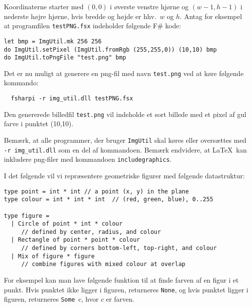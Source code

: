 \documentclass[a4paper,12pt]{article}
\begin{document}
Koordinaterne starter med $(0,0)$ i øverste venstre hjørne og
$(w-1,h-1)$ i nederste højre hjørne, hvis bredde og højde er hhv.\ $w$
og $h$.  Antag for eksempel at programfilen \texttt{testPNG.fsx}
indeholder følgende F\# kode:

\begin{lstlisting}[numbers=none,frame=none,mathescape]
let bmp = ImgUtil.mk 256 256
do ImgUtil.setPixel (ImgUtil.fromRgb (255,255,0)) (10,10) bmp
do ImgUtil.toPngFile "test.png" bmp
\end{lstlisting}

\noindent
Det er nu muligt at generere en png-fil med navn \texttt{test.png} ved
at køre følgende kommando:

\vspace{-4mm}
\begin{verbatim}
  fsharpi -r img_util.dll testPNG.fsx
\end{verbatim}
\vspace{-4mm}

\noindent
Den genererede billedfil \texttt{test.png} vil indeholde
et sort billede med et pixel af gul farve i punktet (10,10).

\noindent
Bemærk, at alle programmer, der bruger \texttt{ImgUtil} skal køres
eller oversættes med \texttt{-r img\_util.dll} som en del af
kommandoen.
%
Bemærk endvidere, at \LaTeX\ kan inkludere png-filer med
kommandoen \texttt{includegraphics}.

\vspace{2ex}

\noindent
I det følgende vil vi repræsentere geometriske figurer med følgende
datastruktur:

\begin{lstlisting}[numbers=none,frame=none,mathescape]
type point = int * int // a point (x, y) in the plane
type colour = int * int * int  // (red, green, blue), 0..255

type figure =
  | Circle of point * int * colour
     // defined by center, radius, and colour
  | Rectangle of point * point * colour
     // defined by corners bottom-left, top-right, and colour
  | Mix of figure * figure
     // combine figures with mixed colour at overlap
\end{lstlisting}

\noindent
For eksempel kan man lave følgende funktion til at finde farven af en
figur i et punkt.  Hvis punktet ikke ligger i figuren, returneres
\texttt{None}, og hvis punktet ligger i figuren, returneres
\texttt{Some $c$}, hvor $c$ er farven.
\end{document}
